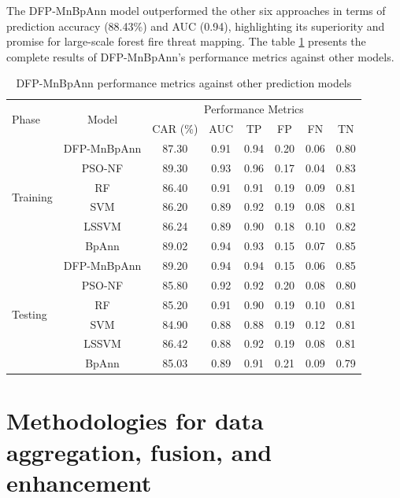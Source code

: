 The DFP-MnBpAnn model outperformed the other six approaches in terms of prediction accuracy (88.43\%) and AUC (0.94), highlighting its superiority and promise for large-scale forest fire threat mapping. The table \ref{table_dfp} presents the complete results of DFP-MnBpAnn's performance metrics against other models.


\begin{table}[h!]
\caption{DFP-MnBpAnn performance metrics against other prediction models \cite{TIENBUI2018104}}
    \centering
    \begin{tabular}{lccccccc}
        \hline
        \multirow{2}{*}{Phase} & \multirow{2}{*}{Model} & \multicolumn{6}{c}{Performance Metrics} \\
        \cline{3-8}
         & & CAR (\%) & AUC & TP & FP & FN & TN \\
        \hline
        \multirow{6}{*}{Training} & DFP-MnBpAnn & 87.30 & 0.91 & 0.94 & 0.20 & 0.06 & 0.80 \\
         & PSO-NF & 89.30 & 0.93 & 0.96 & 0.17 & 0.04 & 0.83 \\
         & RF & 86.40 & 0.91 & 0.91 & 0.19 & 0.09 & 0.81 \\
         & SVM & 86.20 & 0.89 & 0.92 & 0.19 & 0.08 & 0.81 \\
         & LSSVM & 86.24 & 0.89 & 0.90 & 0.18 & 0.10 & 0.82 \\
         & BpAnn & 89.02 & 0.94 & 0.93 & 0.15 & 0.07 & 0.85 \\
        \hline
        \multirow{6}{*}{Testing} & DFP-MnBpAnn & 89.20 & 0.94 & 0.94 & 0.15 & 0.06 & 0.85 \\
         & PSO-NF & 85.80 & 0.92 & 0.92 & 0.20 & 0.08 & 0.80 \\
         & RF & 85.20 & 0.91 & 0.90 & 0.19 & 0.10 & 0.81 \\
         & SVM & 84.90 & 0.88 & 0.88 & 0.19 & 0.12 & 0.81 \\
         & LSSVM & 86.42 & 0.88 & 0.92 & 0.19 & 0.08 & 0.81 \\
         & BpAnn & 85.03 & 0.89 & 0.91 & 0.21 & 0.09 & 0.79 \\
        \hline
    \end{tabular}
    \label{table_dfp}
\end{table}


\section{Methodologies for data aggregation, fusion, and enhancement}
